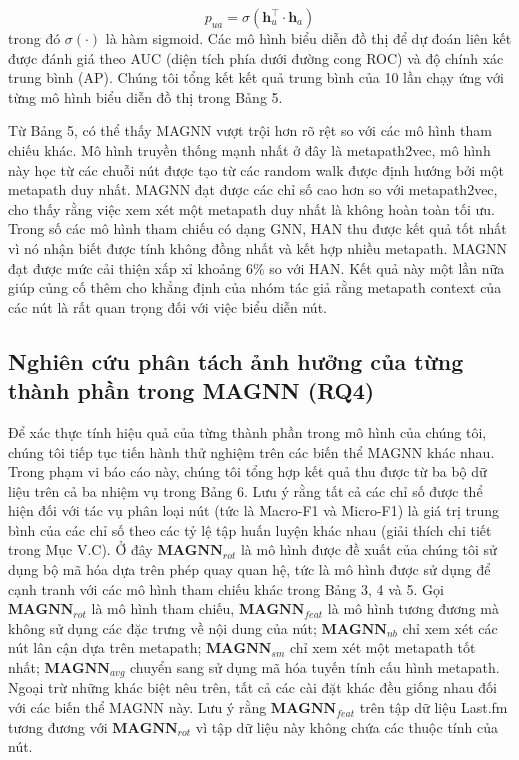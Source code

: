 \begin{equation}
  p_{u a}=\sigma\left(\mathbf{h}_{u}^{\top} \cdot \mathbf{h}_{a}\right)
\end{equation}
trong đó $\sigma(\cdot)$ là hàm sigmoid. Các mô hình biểu diễn đồ thị để dự đoán liên kết được đánh giá theo AUC (diện tích phía dưới đường cong ROC) và độ chính xác trung bình (AP). Chúng tôi tổng kết kết quả trung bình của 10 lần chạy ứng với từng mô hình biểu diễn đồ thị trong Bảng 5. 

Từ Bảng 5, có thể thấy MAGNN vượt trội hơn rõ rệt so với các mô hình tham chiếu khác. Mô hình truyền thống mạnh nhất ở đây là metapath2vec, mô hình này học từ các chuỗi nút được tạo từ các random walk được định hướng bởi một metapath duy nhất. MAGNN đạt được các chỉ số cao hơn so với metapath2vec, cho thấy rằng việc xem xét một metapath duy nhất là không hoàn toàn tối ưu. Trong số các mô hình tham chiếu có dạng GNN, HAN thu được kết quả tốt nhất vì nó nhận biết được tính không đồng nhất và kết hợp nhiều metapath. MAGNN đạt được mức cải thiện xấp xỉ khoảng $6 \%$ so với HAN. Kết quả này một lần nữa giúp củng cố thêm cho khẳng định của nhóm tác giả rằng  metapath context của các nút là rất quan trọng đối với việc biểu diễn nút.

\subsection{Nghiên cứu phân tách ảnh hưởng của từng thành phần trong MAGNN (RQ4)}
Để xác thực tính hiệu quả của từng thành phần trong mô hình của chúng tôi, chúng tôi tiếp tục tiến hành thử nghiệm trên các biến thể MAGNN khác nhau. Trong phạm vi báo cáo này, chúng tôi tổng hợp kết quả thu được từ ba bộ dữ liệu trên cả ba nhiệm vụ trong Bảng 6. Lưu ý rằng tất cả các chỉ số được thể hiện đối với tác vụ phân loại nút (tức là Macro-F1 và Micro-F1) là giá trị trung bình của các chỉ số theo các tỷ lệ tập huấn luyện khác nhau (giải thích chi tiết trong Mục V.C). Ở đây $\mathbf{MAGNN}_{rot}$ là mô hình được đề xuất của chúng tôi sử dụng bộ mã hóa dựa trên phép quay quan hệ, tức là mô hình được sử dụng để cạnh tranh với các mô hình tham chiếu khác trong Bảng 3, 4 và 5. Gọi $\mathbf{MAGNN}_{rot}$ là mô hình tham chiếu, $\mathbf{MAGNN}_{feat}$ là mô hình tương đương mà không sử dụng các đặc trưng về nội dung của nút; $\mathbf{MAGNN}_{nb}$ chỉ xem xét các nút lân cận dựa trên metapath; $\mathbf{MAGNN}_{sm}$ chỉ xem xét một metapath tốt nhất; $\mathbf{MAGNN}_{avg}$ chuyển sang sử dụng mã hóa tuyến tính cấu hình metapath. Ngoại trừ những khác biệt nêu trên, tất cả các cài đặt khác đều giống nhau đối với các biến thể MAGNN này. Lưu ý rằng $\mathbf{MAGNN}_{feat}$ trên tập dữ liệu Last.fm tương đương với $\mathbf{MAGNN}_{rot}$ vì tập dữ liệu này không chứa các thuộc tính của nút.

